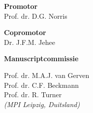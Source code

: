 {\setlength{\parindent}{0cm}\raggedright\smaller

\newpage

\hspace{-12pt}\textbf{Promotor}\\
Prof. dr. D.G. Norris
\vspace{12pt}

\hspace{-12pt}\textbf{Copromotor}\\
Dr. J.F.M. Jehee
\vspace{20pt}

\hspace{-12pt}\textbf{Manuscriptcommissie}

\vspace{6pt}
Prof. dr. M.A.J. van Gerven\\

\vspace{6pt}
Prof. dr. C.F. Beckmann\\

\vspace{6pt}
Prof. dr. R. Turner\\
\emph{(MPI Leipzig, Duitsland)}

\vfill
}

\newpage


\thispagestyle{empty}

{\setlength{\parindent}{0cm}
\begin{flushright}
\end{flushright}
}

